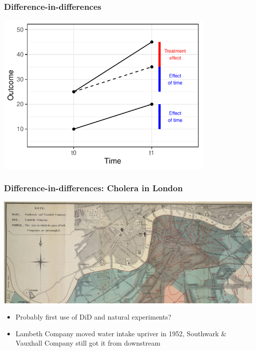 \documentclass[aspectratio=43]{beamer}
\begin{document}
\begin{frame}
\frametitle{Difference-in-differences}
\centering

\includegraphics[width = 0.8\textwidth]{../img/did5}

\end{frame}

\begin{frame}
\frametitle{Difference-in-differences: Cholera in London}
\centering

\includegraphics[width = \textwidth]{../img/snow_map}

\begin{itemize}
  \item Probably first use of DiD and natural experiments?
  \item Lambeth Company moved water intake upriver in 1952, Southwark \& Vauxhall Company still got it from downstream
\end{itemize}

\end{frame}
\end{document}
